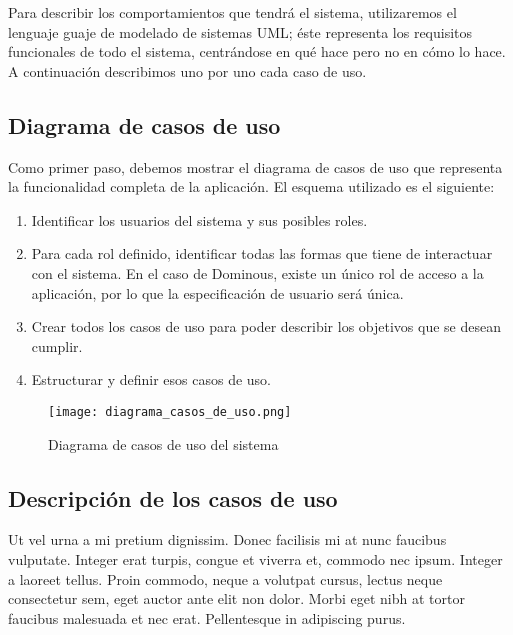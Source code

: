 Para describir los comportamientos que tendrá el sistema, utilizaremos el lenguaje guaje de modelado de sistemas UML;
éste representa los requisitos funcionales de todo el sistema, centrándose en qué hace pero no en cómo lo hace.\\

A continuación describimos uno por uno cada caso de uso.

\subsection{Diagrama de casos de uso}

Como primer paso, debemos mostrar el diagrama de casos de uso que representa la funcionalidad completa de la aplicación.
El esquema utilizado es el siguiente:
\begin{enumerate}
    \item Identificar los usuarios del sistema y sus posibles roles.
    \item Para cada rol definido, identificar todas las formas que tiene de interactuar con el sistema. En el caso
            de Dominous, existe un único rol de acceso a la aplicación, por lo que la especificación de usuario
            será única.
    \item Crear todos los casos de uso para poder describir los objetivos que se desean cumplir.
    \item Estructurar y definir esos casos de uso.
\end{enumerate}

\begin{figure}[h]
  \label{diagrama-casos-uso}
  \begin{center}
    \texttt{[image: diagrama\_casos\_de\_uso.png]}
  \end{center}
  \caption{Diagrama de casos de uso del sistema}
\end{figure}


\subsection{Descripción de los casos de uso}

Ut vel urna a mi pretium dignissim. Donec facilisis mi at nunc faucibus vulputate. Integer erat
turpis, congue et viverra et, commodo nec ipsum. Integer a laoreet tellus. Proin commodo, neque
a volutpat cursus, lectus neque consectetur sem, eget auctor ante elit non dolor. Morbi eget
nibh at tortor faucibus malesuada et nec erat. Pellentesque in adipiscing purus.
